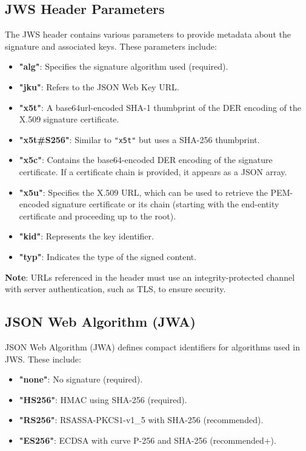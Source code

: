 \subsection{JWS Header Parameters}

The JWS header contains various parameters to provide metadata about the signature and associated keys. These parameters include:

\begin{itemize}
    \item \textbf{"alg"}: Specifies the signature algorithm used
      (required).
    \item \textbf{"jku"}: Refers to the JSON Web Key URL.
    \item \textbf{"x5t"}: A base64url-encoded SHA-1 thumbprint of the
      DER encoding of the X.509 signature certificate.
    \item \textbf{"x5t\#S256"}: Similar to \texttt{"x5t"} but uses a
      SHA-256 thumbprint.
    \item \textbf{"x5c"}: Contains the base64-encoded DER encoding of
      the signature certificate. If a certificate chain is provided,
      it appears as a JSON array.
    \item \textbf{"x5u"}: Specifies the X.509 URL, which can be used
      to retrieve the PEM-encoded signature certificate or its chain
      (starting with the end-entity certificate and proceeding up to
      the root).
    \item \textbf{"kid"}: Represents the key identifier.
    \item \textbf{"typ"}: Indicates the type of the signed content.
\end{itemize}

\textbf{Note}: URLs referenced in the header must use an
integrity-protected channel with server authentication, such as TLS,
to ensure security.

\subsection{JSON Web Algorithm (JWA)}
JSON Web Algorithm (JWA) defines compact identifiers for algorithms
used in JWS. These include:

\begin{itemize}
    \item \textbf{"none"}: No signature (required).
    \item \textbf{"HS256"}: HMAC using SHA-256 (required).
    \item \textbf{"RS256"}: RSASSA-PKCS1-v1\_5 with SHA-256 (recommended).
    \item \textbf{"ES256"}: ECDSA with curve P-256 and SHA-256 (recommended+).
\end{itemize}

